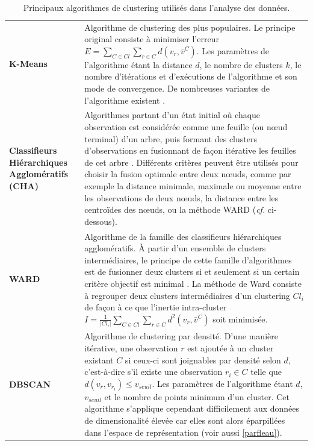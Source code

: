 \begin{longtable}{ @{\hspace{-2.7cm}} >{\bfseries}p{}|>{\small}p{\textwidth}}
      \caption[Algorithmes de clustering utilisés]{Principaux algorithmes de clustering utilisés dans l'analyse des données.}\\ \label{tabalgoclust}
      K-Means & \citep{hartigan1975clustering,hartigan1979algorithm} Algorithme de clustering des plus populaires. Le principe original consiste à minimiser l'erreur $E=\sum_{C \in Cl}\sum_{r \in C} d(v_{r},\bar{v}^{C})$. Les paramètres de l'algorithme étant la distance $d$, le nombre de clusters $k$, le nombre d'itérations et d'exécutions de l'algorithme et son mode de convergence. De nombreuses variantes de l'algorithme existent \citep{gan2007data}.
	\\[0.4cm]
     Classifieurs \mbox{Hiérarchiques} \mbox{Agglomératifs} (CHA)
      & Algorithmes partant d'un état initial où chaque observation est considérée comme une feuille (ou nœud terminal) d'un arbre, puis formant des clusters d'observations en fusionnant de façon itérative les feuilles de cet arbre \citep{gan2007data}. Différents critères peuvent être utilisés pour choisir la fusion optimale entre deux nœuds, comme par exemple la distance minimale, maximale ou moyenne entre les observations de deux nœuds, la distance entre les centroïdes des nœuds, ou la méthode WARD (\textit{cf.} ci-dessous). 
	\\[0.4cm]
     WARD & \citep{ward1963hierarchical,ward1963application} Algorithme de la famille des classifieurs hiérarchiques agglomératifs. À partir d'un ensemble de clusters intermédiaires, le principe de cette famille d'algorithmes est de fusionner deux clusters si et seulement si un certain critère objectif est minimal \citep{gan2007data}. La méthode de Ward consiste à regrouper deux clusters intermédiaires d'un clustering $Cl_{i}$ de façon à ce que l'inertie intra-cluster $I=\frac{1}{|Cl_{i}|}\sum_{C \in Cl}\sum_{r \in C}d^{2}(v_{r},\bar{v}^{C}) $ soit minimisée.
	\\[0.4cm]
     DBSCAN & \citep{ester1996density} Algorithme de clustering par densité. D'une manière itérative, une observation $r$ est ajoutée à un cluster existant $C$ si ceux-ci sont joignables par densité selon $d$, c'est-à-dire s'il existe une observation $r_{i} \in C$ telle que $d(v_{r},v_{r_{i}})\leqslant v_{seuil}$. Les paramètres de l'algorithme étant $d$, $v_{seuil}$ et le nombre de points minimum d'un cluster. Cet algorithme s'applique cependant difficilement aux données de dimensionalité élevée car elles sont alors éparpillées dans l'espace de représentation \citep{gan2007data} (voir aussi \ref{parfleau}).

\end{longtable}
